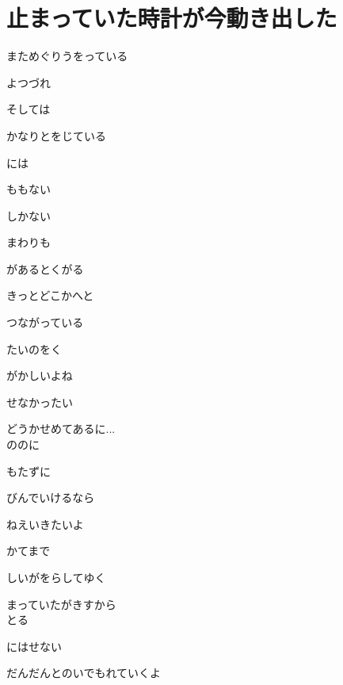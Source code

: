 \section{ 止まっていた時計が今動き出した}
\large{

まためぐりうをっている

よつづれ

そしては

かなりとをじている

には

ももない

しかない

まわりも

があるとくがる

きっとどこかへと

つながっている

たいのをく

がかしいよね

せなかったい

どうかせめてあるに...
\\

ののに

もたずに

びんでいけるなら

ねえいきたいよ

かてまで

しいがをらしてゆく

まっていたがきすから
\\

とる

にはせない

だんだんとのいでもれていくよ

}
